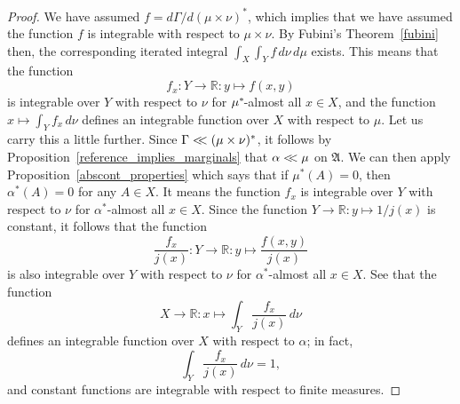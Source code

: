 \documentclass[
twoside=true,
paper=letter,
fontsize=9pt,
pagesize=auto,
leqno,
openany,
headsepline,
overfullrule,
]{scrbook}
\theoremstyle{plain}
\theoremstyle{plain}
\theoremstyle{definition}
\theoremstyle{bfnoteitalic}
\theoremstyle{bfnoteroman}
\newcommand{\sigalg}[1]{\mathfrak{#1}}
\newcommand{\R}{\mathbb{R}}
\newcommand{\sigmaalgebra}{\sigalg{A}}
\newcommand{\kernast}{\ast\kern-1pt}
\newcommand{\funcf}{f}
\newcommand{\funcj}{j}
\newcommand{\function}{f}
\newcommand{\measurespace}{X}
\newcommand{\measurespaceii}{Y}
\newcommand{\mspaceelt}{x}
\newcommand{\mspaceeltii}{y}
\newcommand{\abscont}{\mathrel{< \kern-3.5pt <}}
\newcommand{\measure}{\mu}
\newcommand{\measureii}{\nu}
\newcommand{\seti}{A}
\newcommand{\measonprod}{\Gamma}%
\newcommand{\marginalone}{\alpha}%
\begin{document}
\begin{proof}
We have assumed
$\function = d\measonprod / d(\measure\times\measureii)^*$,
which implies that we have assumed the function $\function$ is integrable with respect to 
$\measure\times\measureii$.
By Fubini's Theorem~\ref{fubini} then, the corresponding iterated integral
$\int_\measurespace\int_\measurespaceii \funcf \,d\measureii\,d\measure$
exists.
This means that the function
\[
\function_\mspaceelt:\measurespaceii\to\R :
\mspaceeltii\mapsto\function(\mspaceelt,\mspaceeltii)
\]
is integrable over $\measurespaceii$ with respect to $\measureii$ for 
$\measure^\kernast$-almost all 
$\mspaceelt\in\measurespace$,
and the function 
$\mspaceelt\mapsto 
\int_\measurespaceii \function_\mspaceelt \, d\measureii$ 
defines an integrable function over $\measurespace$ with respect to $\measure$.
Let us carry this
a little further.  
Since $\measonprod \abscont (\measure\times\measureii)^*$, it follows by Proposition~\ref{reference_implies_marginals} that
$\marginalone\abscont\measure$ on $\sigmaalgebra$.
We can then apply Proposition~\ref{abscont_properties} which says that if
$\measure^*(\seti)=0$, then $\marginalone^*(\seti)=0$ for any $\seti\in\measurespace$.
It means the function 
$\function_\mspaceelt$ 
is integrable over $\measurespaceii$ with respect to $\measureii$ for 
$\marginalone^*$-almost all $\mspaceelt\in\measurespace$.
Since the function
$\measurespaceii\to\R:\mspaceeltii\mapsto 1/ \funcj(\mspaceelt)$ 
is  constant, it follows that the function
\[
\frac{\function_\mspaceelt}{\funcj(\mspaceelt)} :
\measurespaceii\to\R :
\mspaceeltii\mapsto
\frac{\function(\mspaceelt,\mspaceeltii)}{\funcj(\mspaceelt)}
\]
is also integrable over $\measurespaceii$ with respect to $\measureii$ for 
$\marginalone^*$-almost all $\mspaceelt\in\measurespace$.
See that the function
\[
\measurespace\to\R :
\mspaceelt \mapsto 
\int_\measurespaceii 
\frac{\function_\mspaceelt}{\funcj(\mspaceelt)} 
\, d\measureii
\]
defines an integrable function over $\measurespace$ with respect to 
$\marginalone$; in fact,
\[
\int_\measurespaceii 
\frac{\function_\mspaceelt}{\funcj(\mspaceelt)} 
\, d\measureii
= 1,
\]
and constant functions are integrable with respect to finite measures.


\end{proof}
\end{document}

